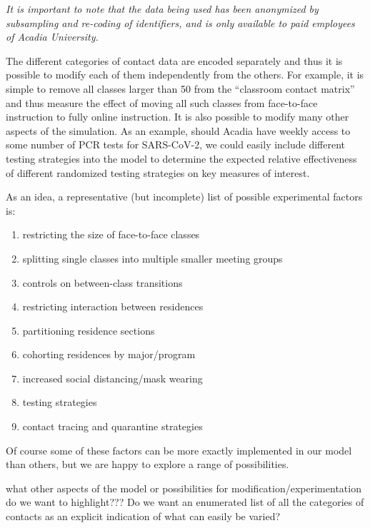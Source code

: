 \documentclass[fleqn,10pt]{SelfArx} %
\newcommand{\ed}[1]{{\color{blue} #1}}
\begin{document}
\emph{It is important to note that the data being used has been anonymized by subsampling and re-coding of identifiers, and is only available to paid employees of Acadia University.}

The different categories of contact data are encoded separately and thus it is possible to modify each of them independently from the others.
For example, it is simple to remove all classes larger than 50 from the ``classroom contact matrix'' and thus measure the effect of moving all such classes from face-to-face instruction to fully online instruction.
It is also possible to modify many other aspects of the simulation.
As an example, should Acadia have weekly access to some number of PCR tests for SARS-CoV-2, we could easily include different testing strategies into the model to determine the expected relative effectiveness of different randomized testing strategies on key measures of interest.  

As an idea, a representative (but incomplete) list of possible experimental factors is:
\begin{enumerate}

    \item restricting the size of face-to-face classes

    \item splitting single classes into multiple smaller meeting groups

    \item controls on between-class transitions

    \item restricting interaction between residences

    \item partitioning residence sections

    \item cohorting residences by major/program

    \item increased social distancing/mask wearing

    \item testing strategies

    \item contact tracing and quarantine strategies


\end{enumerate}
Of course some of these factors can be more exactly implemented in our model than others, but we are happy to explore a range of possibilities.

\ed{what other aspects of the model or possibilities for modification/experimentation do we want to highlight???  Do we want an enumerated list of all the categories of contacts as an explicit indication of what can easily be varied?}
\end{document}
